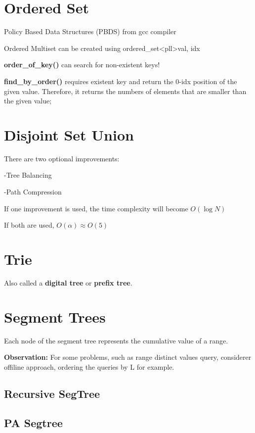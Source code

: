 \section{Ordered Set}

    Policy Based Data Structures (PBDS) from gcc compiler

    Ordered Multiset can be created using ordered\_set\textless pll\textgreater {val, idx}

    \textbf{order\_of\_key()} can search for non-existent keys!
    
    \textbf{find\_by\_order()} requires existent key and return the 0-idx position of the given value.
    Therefore, it returns the numbers of elements that are smaller than the given value;


\section{Disjoint Set Union}

    There are two optional improvements:

        -Tree Balancing 
        
        -Path Compression

    If one improvement is used, 
    the time complexity will become $O(\log{N})$

    If both are used, $O(\alpha) \approx O(5)$


\section{Trie}

    Also called a \textbf{digital tree} or \textbf{prefix tree}.
    

\section{Segment Trees}

    Each node of the segment tree represents the cumulative value of a range.

    \textbf{Observation:} For some problems, such as range distinct values query,
    considerer offiline approach, ordering the queries by L for example. 

    \subsection{Recursive SegTree}


    \subsection{PA Segtree}

